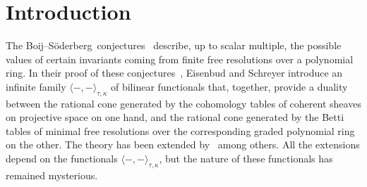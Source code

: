 \documentclass[12pt]{amsart}
\theoremstyle{definition}
\theoremstyle{remark}
\def\BS{Boij--S\"oderberg~}
\begin{document}
\section*{Introduction}
%
%
%


The \BS conjectures~\cite{boij-sod1}
describe, up to scalar multiple, the possible values of certain invariants coming from finite free resolutions over a polynomial ring.  
In their proof of these conjectures~\cite{eis-schrey1}, Eisenbud and Schreyer introduce an infinite family $\langle -,-\rangle_{\tau,\kappa}$ of bilinear functionals that, together, provide a duality between the rational cone generated by the cohomology tables of coherent sheaves on projective space on one hand,  and the rational cone generated by the Betti tables of minimal free resolutions over the corresponding graded polynomial ring on the other. 
The theory has been extended by~\cites{boij-sod2,eis-schrey2} among others. All the extensions depend on the functionals  $\langle -,-\rangle_{\tau,\kappa}$,
but the nature of these functionals has remained mysterious.  
\end{document}

